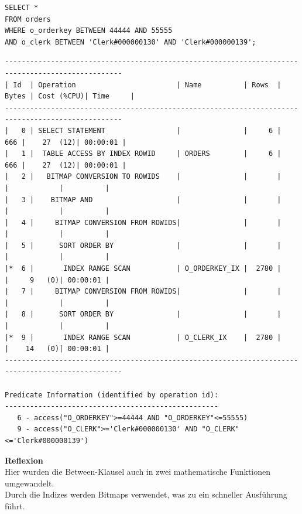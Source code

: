 \documentclass[10pt]{article}
\begin{document}
\begin{lstlisting}[style=sql]
SELECT *
FROM orders
WHERE o_orderkey BETWEEN 44444 AND 55555
AND o_clerk BETWEEN 'Clerk#000000130' AND 'Clerk#000000139';
\end{lstlisting}
\begin{lstlisting}[style=queryexecutionplanSmall]
--------------------------------------------------------------------------------------------------
| Id  | Operation                        | Name          | Rows  | Bytes | Cost (%CPU)| Time     |
--------------------------------------------------------------------------------------------------
|   0 | SELECT STATEMENT                 |               |     6 |   666 |    27  (12)| 00:00:01 |
|   1 |  TABLE ACCESS BY INDEX ROWID     | ORDERS        |     6 |   666 |    27  (12)| 00:00:01 |
|   2 |   BITMAP CONVERSION TO ROWIDS    |               |       |       |            |          |
|   3 |    BITMAP AND                    |               |       |       |            |          |
|   4 |     BITMAP CONVERSION FROM ROWIDS|               |       |       |            |          |
|   5 |      SORT ORDER BY               |               |       |       |            |          |
|*  6 |       INDEX RANGE SCAN           | O_ORDERKEY_IX |  2780 |       |     9   (0)| 00:00:01 |
|   7 |     BITMAP CONVERSION FROM ROWIDS|               |       |       |            |          |
|   8 |      SORT ORDER BY               |               |       |       |            |          |
|*  9 |       INDEX RANGE SCAN           | O_CLERK_IX    |  2780 |       |    14   (0)| 00:00:01 |
--------------------------------------------------------------------------------------------------
 
Predicate Information (identified by operation id):
---------------------------------------------------
   6 - access("O_ORDERKEY">=44444 AND "O_ORDERKEY"<=55555)
   9 - access("O_CLERK">='Clerk#000000130' AND "O_CLERK"<='Clerk#000000139')
\end{lstlisting}
\textbf{Reflexion} \\
Hier wurden die Between-Klausel auch in zwei mathematische Funktionen umgewandelt.\\
Durch die Indizes werden Bitmaps verwendet, was zu ein schneller Ausführung führt.
\end{document}
